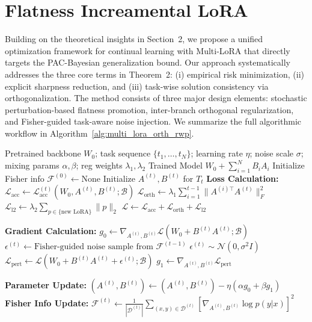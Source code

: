 \documentclass[letterpaper]{article} %
\begin{document}
\section{Flatness Increamental LoRA}
\label{sec:flatness-lora-method}



Building on the theoretical insights in Section~2, we propose a unified optimization framework for continual learning with Multi-LoRA that directly targets the PAC-Bayesian generalization bound. Our approach systematically addresses the three core terms in Theorem~2: (i) empirical risk minimization, (ii) explicit sharpness reduction, and (iii) task-wise solution consistency via orthogonalization. The method consists of three major design elements: stochastic perturbation-based flatness promotion, inter-branch orthogonal regularization, and Fisher-guided task-aware noise injection. We summarize the full algorithmic workflow in Algorithm~\ref{alg:multi_lora_orth_rwp}.


\begin{algorithm}[t]
\caption{Multi-LoRA Training with Task-Aware Perturbation and Orthogonalization}
\label{alg:multi_lora_orth_rwp}
\begin{algorithmic}[1]
\REQUIRE Pretrained backbone $W_0$; task sequence $\{t_1, \dots, t_N\}$; learning rate $\eta$; noise scale $\sigma$; mixing params $\alpha,\beta$; reg weights $\lambda_1,\lambda_2$
\ENSURE Trained Model $W_0+\sum_{i=1}^NB_iA_i$
\STATE Initialize Fisher info $\mathcal{F}^{(0)} \gets \text{None}$
    \STATE Initialize $A^{(t)}, B^{(t)}$ for $T_t$
        \STATE \textbf{Loss Calculation:}
        \STATE $\mathcal{L}_{\text{acc}} \gets \mathcal{L}_{\text{acc}}^{(t)}(W_0, A^{(t)}, B^{(t)}; \mathcal{B})$
        \STATE $\mathcal{L}_{\text{orth}} \gets \lambda_1 \sum_{i=1}^{t-1} \|A^{(i)\top} A^{(t)}\|_F^2$
        \STATE $\mathcal{L}_{\text{l2}} \gets \lambda_2 \sum_{p \in \{\text{new LoRA}\}} \|p\|_2$
        \STATE $\mathcal{L} \gets \mathcal{L}_{\text{acc}} + \mathcal{L}_{\text{orth}} + \mathcal{L}_{\text{l2}}$
        
        \STATE \textbf{Gradient Calculation:}
        \STATE $g_0 \gets \nabla_{A^{(t)}, B^{(t)}} \mathcal{L}(W_0 + B^{(t)}A^{(t)}; \mathcal{B})$
            \STATE $\epsilon^{(t)} \gets \text{Fisher-guided noise sample from } \mathcal{F}^{(t-1)}$
        \ELSE
            \STATE $\epsilon^{(t)} \sim \mathcal{N}(0, \sigma^2 I)$
        \ENDIF
        \STATE $\mathcal{L}_{\text{pert}} \gets \mathcal{L}(W_0 + B^{(t)}A^{(t)} + \epsilon^{(t)}; \mathcal{B})$
        \STATE $g_1 \gets \nabla_{A^{(t)}, B^{(t)}} \mathcal{L}_{\text{pert}}$
        
        \STATE \textbf{Parameter Update:}
        \STATE $(A^{(t)}, B^{(t)}) \gets (A^{(t)}, B^{(t)}) - \eta (\alpha g_0 + \beta g_1)$
    \ENDFOR
    \STATE \textbf{Fisher Info Update:}
    \STATE $\mathcal{F}^{(t)} \gets \frac{1}{|\mathcal{D}^{(t)}|} \sum_{(x,y) \in \mathcal{D}^{(t)}} \left[\nabla_{A^{(t)}, B^{(t)}} \log p(y|x)\right]^2$
\ENDFOR
\end{algorithmic}
\end{algorithm}
\end{document}
